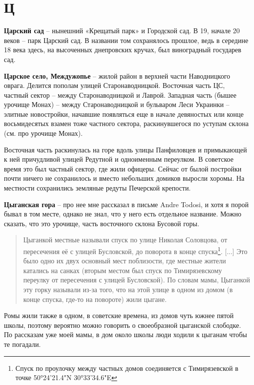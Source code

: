 \chapter*{Ц}

\textbf{Царский сад} – нынешний «Крещатый парк» и Городской сад. В 19, начале 20 веков – парк Царский сад. В названии том сохранялось прошлое, ведь в середине 18 века здесь, на высоченных днепровских кручах, был виноградный государев сад.\\

\medskip

\textbf{Царское село, Междужопье} – жилой район в верхней части Наводницкого оврага. Делится пополам улицей Старонаводницкой. Восточная часть ЦС, частный сектор – между Старонаводницкой и Лаврой. Западная часть (бышее урочище Монах) – между Старонаводницкой и бульваром Леси Украинки – элитные новостройки, начавшие появляться еще в начале девяностых или конце восьмидесятых взамен тоже частного сектора, раскинувшегося по уступам склона (см. про урочище Монах).

Восточная часть раскинулась на горе вдоль улицы Панфиловцев и примыкающей к ней причудливой улицей Редутной и одноименным переулком. В советское время это был частный сектор, где жили офицеры. Сейчас от былой постройки почти ничего не сохранилось и вместо небольших домиков выросли хоромы. На местности сохранились земляные редуты Печерской крепости.\\

\medskip

\textbf{Цыганская гора} – про нее мне рассказал в письме Andre Todosi, и хотя я порой бывал в том месте, однако не знал, что у него есть отдельное название. Можно сказать, что это урочище, часть восточного склона Бусовой горы.

\begin{quotation}
Цыганкой местные называли спуск по улице Николая Соловцова, от пересечения её с улицей Бусловской, до поворота в конце спуска\footnote{Спуск по проулочку между частных домов соединяется с Тимирязевской в точке 50°24'21.4"N 30°33'34.6"E}. [...] Это было одно их двух основный мест поблизости, где местные жители катались на санках (вторым
местом был спуск по Тимирязевскому переулку от пересечения с улицей Бусловской). По словам мамы, Цыганкой эту горку называли из-за того, что на этой улице в одном из домом (в конце спуска, где-то на повороте) жили цыгане.
\end{quotation}

Ромы жили также в одном, в советские времена, из домов чуть южнее пятой школы, поэтому вероятно можно говорить о своеобразной цыганской слободке. По рассказам уже моей мамы, в дом около школы люди ходили к цыганам чтобы те погадали.\\

